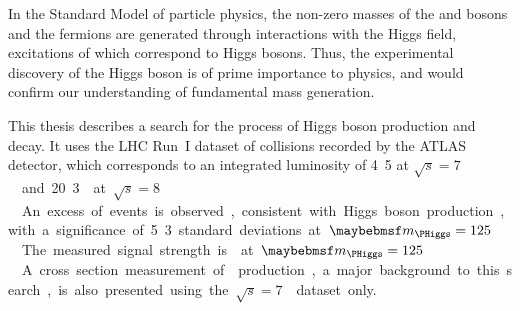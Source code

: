 
In the Standard Model of particle physics, the non-zero masses of the \PW and \PZ bosons and 
the fermions are generated through interactions with the Higgs field, excitations of which 
correspond to Higgs bosons. Thus, the experimental discovery of the Higgs boson is of prime 
importance to physics, and would confirm our understanding of fundamental mass generation.

This thesis describes a search for the \ggHWWlvlv process of Higgs boson production and decay.
It uses the LHC Run~I dataset of \pp collisions recorded by the ATLAS detector, which 
corresponds to an integrated luminosity of \unit{4.5}{\invfb} at \unit{$\sqrt{s} = 7$}{\TeV} 
and \unit{20.3}{\invfb} at \unit{$\sqrt{s} = 8$}{\TeV}. An excess of events is observed, 
consistent with Higgs boson production, with a significance of 5.3 standard deviations at 
\unit{$\mH = 125$}{\GeV}. The measured signal strength is  at 
\unit{$\mH = 125$}{\GeV}. A cross section measurement of \WW production, a major background 
to this search, is also presented using the \unit{$\sqrt{s} = 7$}{\TeV} dataset only.
